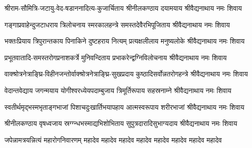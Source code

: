 
\twolineshloka
{श्रीराम-सौमित्रि-जटायु-वेद-षडाननादित्य-कुजार्चिताय}
{श्रीनीलकण्ठाय दयामयाय श्रीवैद्यनाथाय नमः शिवाय}

%
\twolineshloka
{गङ्गाप्रवाहेन्दुजटाधराय त्रिलोचनाय स्मरकालहन्त्रे}
{समस्तदेवैरभिपूजिताय श्रीवैद्यनाथाय नमः शिवाय}

\twolineshloka
{भक्तःप्रियाय त्रिपुरान्तकाय पिनाकिने दुष्टहराय नित्यम्}
{प्रत्यक्षलीलाय मनुष्यलोके श्रीवैद्यनाथाय नमः शिवाय}

\twolineshloka
{प्रभूतवातादि-समस्तरोगप्रनाशकर्त्रे मुनिवन्दिताय}
{प्रभाकरेन्द्वग्निविलोचनाय श्रीवैद्यनाथाय नमः शिवाय}

\twolineshloka
{वाक्श्रोत्रनेत्राङ्घ्रि-विहीनजन्तोर्वाक्श्रोत्रनेत्राङ्घ्रि-सुखप्रदाय}
{कुष्ठादिसर्वोन्नतरोगहन्त्रे श्रीवैद्यनाथाय नमः शिवाय}

\twolineshloka
{वेदान्तवेद्याय जगन्मयाय योगीश्वरध्येयपदाम्बुजाय}
{त्रिमूर्तिरूपाय सहस्रनाम्ने श्रीवैद्यनाथाय नमः शिवाय}

\twolineshloka
{स्वतीर्थमृद्भस्मभृताङ्गभाजां पिशाचदुःखार्तिभयापहाय}
{आत्मस्वरूपाय शरीरभाजां श्रीवैद्यनाथाय नमः शिवाय}

\twolineshloka
{श्रीनीलकण्ठाय वृषध्वजाय स्रग्ग्न्धभस्माद्यभिशोभिताय}
{सुपुत्रदारादिसुभाग्यदाय श्रीवैद्यनाथाय नमः शिवाय}

{जपेन्नामत्रयन्नित्यं महारोगनिवारणम्}
{महादेव महादेव महादेव महादेव महादेव महादेव महादेव महादेव}

